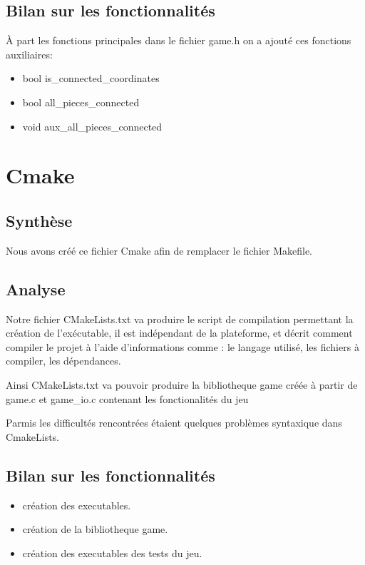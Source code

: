 \documentclass[12pt]{article}
\begin{document}
\subsection{Bilan sur les fonctionnalités}
\`A part les fonctions principales dans le fichier game.h on a ajouté ces fonctions auxiliaires:

\begin{itemize}
\item bool is\_connected\_coordinates

\item bool all\_pieces\_connected

\item void aux\_all\_pieces\_connected
\end{itemize}


\section{Cmake}
\subsection{Synthèse}
Nous avons créé ce fichier Cmake afin de remplacer le fichier Makefile.
\subsection{Analyse}
Notre fichier CMakeLists.txt va produire le script de compilation permettant la création de l'exécutable,
il est indépendant de la plateforme, et décrit comment compiler le projet à l'aide d'informations comme : le langage utilisé, les fichiers à compiler, les dépendances.

Ainsi CMakeLists.txt va pouvoir produire la bibliotheque game créée à partir de game.c et game\_io.c contenant les fonctionalités du jeu

Parmis les difficultés rencontrées étaient quelques problèmes syntaxique dans CmakeLists.
\subsection{Bilan sur les fonctionnalités}
\begin{itemize}
\item création des executables.
\item création de la bibliotheque game.
\item création des executables des tests du jeu.
\end{itemize}
\end{document}
